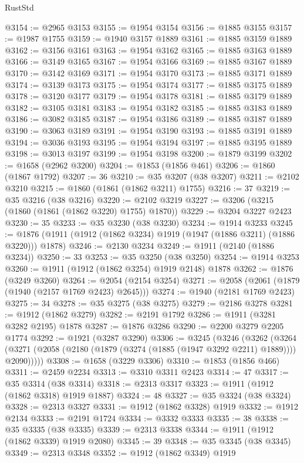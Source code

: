 \begin{lexlean}{RustStd}
\begin{coremodule}
@3154 := @2965 @3153
@3155 := @1954 @3154
@3156 := @1885 @3155
@3157 := @1987 @1755
@3159 := @1940 @3157 @1889
@3161 := @1885 @3159 @1889
@3162 := @3156 @3161
@3163 := @1954 @3162
@3165 := @1885 @3163 @1889
@3166 := @3149 @3165
@3167 := @1954 @3166
@3169 := @1885 @3167 @1889
@3170 := @3142 @3169
@3171 := @1954 @3170
@3173 := @1885 @3171 @1889
@3174 := @3139 @3173
@3175 := @1954 @3174
@3177 := @1885 @3175 @1889
@3178 := @3120 @3177
@3179 := @1954 @3178
@3181 := @1885 @3179 @1889
@3182 := @3105 @3181
@3183 := @1954 @3182
@3185 := @1885 @3183 @1889
@3186 := @3082 @3185
@3187 := @1954 @3186
@3189 := @1885 @3187 @1889
@3190 := @3063 @3189
@3191 := @1954 @3190
@3193 := @1885 @3191 @1889
@3194 := @3036 @3193
@3195 := @1954 @3194
@3197 := @1885 @3195 @1889
@3198 := @3013 @3197
@3199 := @1954 @3198
@3200 := @1879 @3199
@3202 := @1658 (@2962 @3200)
@3204 := @1853 (@1856 @461)
@3206 := @1860 (@1867 @1792)
@3207 := 36
@3210 := @35 @3207 (@38 @3207)
@3211 := @2102 @3210
@3215 := @1860 (@1861 (@1862 @3211) @1755)
@3216 := 37
@3219 := @35 @3216 (@38 @3216)
@3220 := @2102 @3219
@3227 := @3206 (@3215 (@1860 (@1861 (@1862 @3220) @1755) @1870))
@3229 := @3204 @3227 @2423
@3230 := 35
@3233 := @35 @3230 (@38 @3230)
@3234 := @1914 @3233
@3245 := @1876 (@1911 (@1912 (@1862 @3234) @1919 (@1947 (@1886 @3211) (@1886 @3220))) @1878)
@3246 := @2130 @3234
@3249 := @1911 (@2140 (@1886 @3234))
@3250 := 33
@3253 := @35 @3250 (@38 @3250)
@3254 := @1914 @3253
@3260 := @1911 (@1912 (@1862 @3254) @1919 @2148) @1878
@3262 := @1876 (@3249 @3260)
@3264 := @2054 (@2154 @3254)
@3271 := @2058 (@2061 (@1879 (@1940 (@2157 @1769 @2423) @2645)))
@3274 := @1940 (@2181 @1769 @2423)
@3275 := 34
@3278 := @35 @3275 (@38 @3275)
@3279 := @2186 @3278
@3281 := @1912 (@1862 @3279)
@3282 := @2191 @1792
@3286 := @1911 (@3281 @3282 @2195) @1878
@3287 := @1876 @3286
@3290 := @2200 @3279 @2205 @1774
@3292 := @1921 (@3287 @3290)
@3306 := @3245
    (@3246
      (@3262
        (@3264 (@3271 (@2058 (@2180 (@1879 (@3274 (@1885 (@1947 @3292 @2211) @1889)))) @2090)))))
@3308 := @1658 (@3229 @3306)
@3310 := @1853 (@1856 @466)
@3311 := @2459 @2234
@3313 := @3310 @3311 @2423
@3314 := 47
@3317 := @35 @3314 (@38 @3314)
@3318 := @2313 @3317
@3323 := @1911 (@1912 (@1862 @3318) @1919 @1887)
@3324 := 48
@3327 := @35 @3324 (@38 @3324)
@3328 := @2313 @3327
@3331 := @1912 (@1862 @3328) @1919
@3332 := @1912 @2134
@3333 := @2191 @1724
@3334 := @3332 @3333
@3335 := 38
@3338 := @35 @3335 (@38 @3335)
@3339 := @2313 @3338
@3344 := @1911 (@1912 (@1862 @3339) @1919 @2080)
@3345 := 39
@3348 := @35 @3345 (@38 @3345)
@3349 := @2313 @3348
@3352 := @1912 (@1862 @3349) @1919

\end{coremodule}
\end{lexlean}

